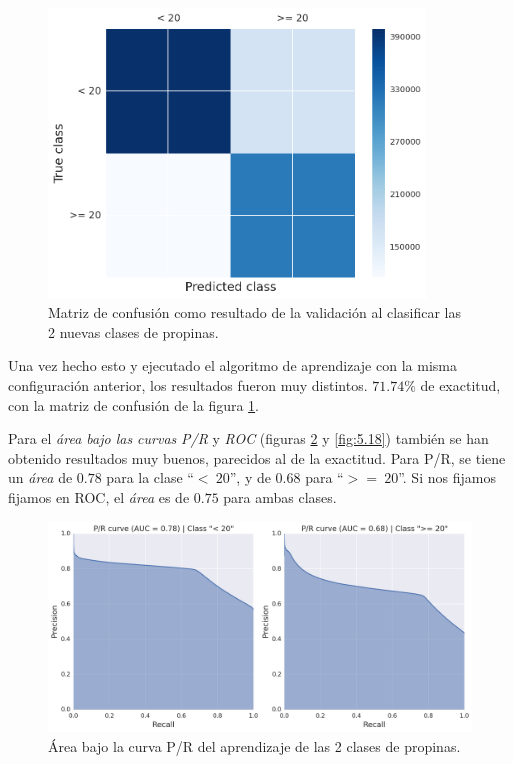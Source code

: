 \begin{figure}[H]
  \centering
  \includegraphics[width=100mm]{figures/ch_05/confusion_matrix_2.png}
  \caption{Matriz de confusión como resultado de la validación al clasificar las 2 nuevas clases de propinas.}
  \label{fig:5.16}
\end{figure}

Una vez hecho esto y ejecutado el algoritmo de aprendizaje con la misma configuración anterior, los resultados fueron muy distintos. $71.74\%$ de exactitud, con la matriz de confusión de la figura \ref{fig:5.16}.

Para el \emph{área bajo las curvas} \emph{P/R} y \emph{ROC} (figuras \ref{fig:5.17} y \ref{fig:5.18}) también se han obtenido resultados muy buenos, parecidos al de la exactitud. Para P/R, se tiene un \emph{área} de $0.78$ para la clase ``$<\:20$'', y de $0.68$ para ``$>=\:20$''. Si nos fijamos fijamos en ROC, el \emph{área} es de $0.75$ para ambas clases.

\begin{figure}[H]
  \centering
  \includegraphics[width=140mm]{figures/ch_05/pr_auc.png}
  \caption{Área bajo la curva P/R del aprendizaje de las 2 clases de propinas.}
  \label{fig:5.17}
\end{figure}

